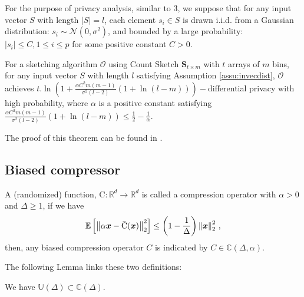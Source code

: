 \begin{assumption}\label{assu:invecdist}
For the purpose of privacy analysis, similar to 3, we suppose that for any input vector $S$ with length $|S|=l$, each element $s_i\in S$ is drawn i.i.d. from a Gaussian distribution: $s_i\sim \mathcal{N}(0,\sigma^2)$, and bounded by a large probability:  $|s_i|\leq C, 1\leq i\leq p$ for some positive constant $C>0$.    
\end{assumption}

\begin{theorem}
For a sketching algorithm $\mathcal{O}$ using Count Sketch $\mathbf{S}_{t\times m}$ with $t$ arrays of $m$ bins, for any input vector $S$ with length $l$ satisfying Assumption \ref{assu:invecdist}, $\mathcal{O}$ achieves $t.\ln \left(1+\frac{\alpha C^2 m(m-1)}{\sigma^2(l-2)}(1+\ln(l-m) )\right)-$differential privacy with high probability, where $\alpha$ is a positive constant satisfying $\frac{\alpha C^2 m(m-1)}{\sigma^2(l-2)}(1+\ln(l-m) )\leq \frac{1}{2}-\frac{1}{\alpha}$.
\end{theorem}
The proof of this theorem can be found in \cite{li2019privacy}.




\subsection{Biased compressor}
\begin{definition}
A (randomized) function,  ${\text{C}}:\mathbb{R}^{d}\rightarrow\mathbb{R}^{d}$ is called a compression operator with $\alpha>0$ and $\Delta\geq 1$, if we have 
\begin{align}\notag
    \mathbb{E}\left[\left\|\alpha\boldsymbol{x}-\bar{\text{C}}(\boldsymbol{x})\right\|^2_2\right]\leq \left(1-\frac{1}{\Delta}\right)\left\|\boldsymbol{x}\right\|^2_2\, ,
\end{align}
then, any biased compression operator $C$ is indicated by $C\in \mathbb{C}(\Delta,\alpha)$. 
\end{definition}
The following Lemma links these two definitions:
\begin{lemma}
We have $\mathbb{U}(\Delta)\subset\mathbb{C}(\Delta)$.
\end{lemma}

